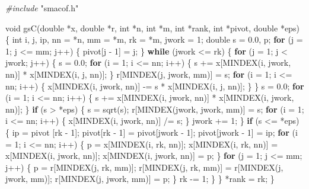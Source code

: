 \documentclass[
  12pt,
]{book}
\newenvironment{Shaded}{\begin{snugshade}}{\end{snugshade}}
\newcommand{\ControlFlowTok}[1]{\textcolor[rgb]{0.13,0.29,0.53}{\textbf{#1}}}
\newcommand{\DataTypeTok}[1]{\textcolor[rgb]{0.13,0.29,0.53}{#1}}
\newcommand{\DecValTok}[1]{\textcolor[rgb]{0.00,0.00,0.81}{#1}}
\newcommand{\FloatTok}[1]{\textcolor[rgb]{0.00,0.00,0.81}{#1}}
\newcommand{\ImportTok}[1]{#1}
\newcommand{\NormalTok}[1]{#1}
\newcommand{\PreprocessorTok}[1]{\textcolor[rgb]{0.56,0.35,0.01}{\textit{#1}}}
\theoremstyle{definition}
\theoremstyle{definition}
\theoremstyle{definition}
\theoremstyle{definition}
\theoremstyle{remark}
\begin{document}
\begin{Shaded}
\begin{Highlighting}[]
\PreprocessorTok{\#include }\ImportTok{"smacof.h"}

\DataTypeTok{void}\NormalTok{ gsC(}\DataTypeTok{double}\NormalTok{ *x, }\DataTypeTok{double}\NormalTok{ *r, }\DataTypeTok{int}\NormalTok{ *n, }\DataTypeTok{int}\NormalTok{ *m, }\DataTypeTok{int}\NormalTok{ *rank, }\DataTypeTok{int}\NormalTok{ *pivot,}
         \DataTypeTok{double}\NormalTok{ *eps) \{}
  \DataTypeTok{int}\NormalTok{ i, j, ip, nn = *n, mm = *m, rk = *m, jwork = }\DecValTok{1}\NormalTok{;}
  \DataTypeTok{double}\NormalTok{ s = }\FloatTok{0.0}\NormalTok{, p;}
  \ControlFlowTok{for}\NormalTok{ (j = }\DecValTok{1}\NormalTok{; j \textless{}= mm; j++) \{}
\NormalTok{    pivot[j {-} }\DecValTok{1}\NormalTok{] = j;}
\NormalTok{  \}}
  \ControlFlowTok{while}\NormalTok{ (jwork \textless{}= rk) \{}
    \ControlFlowTok{for}\NormalTok{ (j = }\DecValTok{1}\NormalTok{; j \textless{} jwork; j++) \{}
\NormalTok{      s = }\FloatTok{0.0}\NormalTok{;}
      \ControlFlowTok{for}\NormalTok{ (i = }\DecValTok{1}\NormalTok{; i \textless{}= nn; i++) \{}
\NormalTok{        s += x[MINDEX(i, jwork, nn)] * x[MINDEX(i, j, nn)];}
\NormalTok{      \}}
\NormalTok{      r[MINDEX(j, jwork, mm)] = s;}
      \ControlFlowTok{for}\NormalTok{ (i = }\DecValTok{1}\NormalTok{; i \textless{}= nn; i++) \{}
\NormalTok{        x[MINDEX(i, jwork, nn)] {-}= s * x[MINDEX(i, j, nn)];}
\NormalTok{      \}}
\NormalTok{    \}}
\NormalTok{    s = }\FloatTok{0.0}\NormalTok{;}
    \ControlFlowTok{for}\NormalTok{ (i = }\DecValTok{1}\NormalTok{; i \textless{}= nn; i++) \{}
\NormalTok{      s += x[MINDEX(i, jwork, nn)] * x[MINDEX(i, jwork, nn)];}
\NormalTok{    \}}
    \ControlFlowTok{if}\NormalTok{ (s \textgreater{} *eps) \{}
\NormalTok{      s = sqrt(s);}
\NormalTok{      r[MINDEX(jwork, jwork, mm)] = s;}
      \ControlFlowTok{for}\NormalTok{ (i = }\DecValTok{1}\NormalTok{; i \textless{}= nn; i++) \{}
\NormalTok{        x[MINDEX(i, jwork, nn)] /= s;}
\NormalTok{      \}}
\NormalTok{      jwork += }\DecValTok{1}\NormalTok{;}
\NormalTok{    \}}
    \ControlFlowTok{if}\NormalTok{ (s \textless{}= *eps) \{}
\NormalTok{      ip = pivot [rk {-} }\DecValTok{1}\NormalTok{];}
\NormalTok{      pivot[rk {-} }\DecValTok{1}\NormalTok{] = pivot[jwork {-} }\DecValTok{1}\NormalTok{];}
\NormalTok{      pivot[jwork {-} }\DecValTok{1}\NormalTok{] = ip;}
      \ControlFlowTok{for}\NormalTok{ (i = }\DecValTok{1}\NormalTok{; i \textless{}= nn; i++) \{}
\NormalTok{        p = x[MINDEX(i, rk, nn)];}
\NormalTok{        x[MINDEX(i, rk, nn)] = x[MINDEX(i, jwork, nn)];}
\NormalTok{        x[MINDEX(i, jwork, nn)] = p;}
\NormalTok{      \}}
      \ControlFlowTok{for}\NormalTok{ (j = }\DecValTok{1}\NormalTok{; j \textless{}= mm; j++) \{}
\NormalTok{        p = r[MINDEX(j, rk, mm)];}
\NormalTok{        r[MINDEX(j, rk, mm)] = r[MINDEX(j, jwork, mm)];}
\NormalTok{        r[MINDEX(j, jwork, mm)] = p;}
\NormalTok{      \}}
\NormalTok{      rk {-}= }\DecValTok{1}\NormalTok{;}
\NormalTok{    \}}
\NormalTok{  \}}
\NormalTok{  *rank = rk;}
\NormalTok{\}}
\end{Highlighting}
\end{Shaded}
\end{document}
